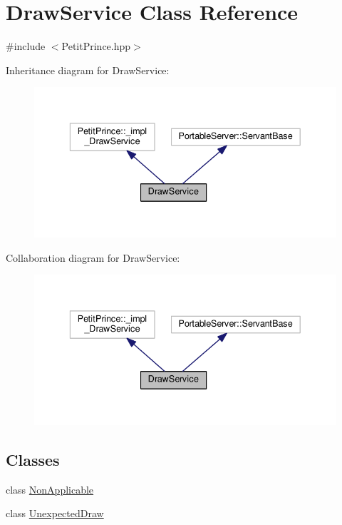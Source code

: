 \hypertarget{class_draw_service}{}\section{Draw\+Service Class Reference}
\label{class_draw_service}


{\ttfamily \#include $<$Petit\+Prince.\+hpp$>$}



Inheritance diagram for Draw\+Service\+:
\nopagebreak
\begin{figure}[H]
\begin{center}
\leavevmode
\includegraphics[width=336pt]{class_draw_service__inherit__graph}
\end{center}
\end{figure}


Collaboration diagram for Draw\+Service\+:
\nopagebreak
\begin{figure}[H]
\begin{center}
\leavevmode
\includegraphics[width=336pt]{class_draw_service__coll__graph}
\end{center}
\end{figure}
\subsection*{Classes}
\begin{DoxyCompactItemize}
\item 
class \hyperlink{class_draw_service_1_1_non_applicable}{Non\+Applicable}
\item 
class \hyperlink{class_draw_service_1_1_unexpected_draw}{Unexpected\+Draw}
\end{DoxyCompactItemize}
